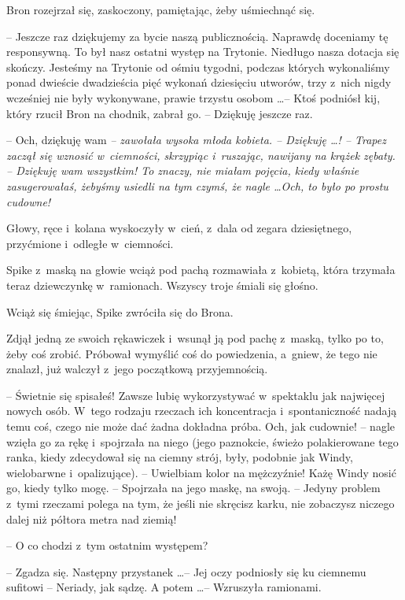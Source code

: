 \documentclass[oneside,polish,11pt,rmheadings]{mwbk}
\begin{document}
Bron rozejrzał się, zaskoczony, pamiętając, żeby uśmiechnąć się. 

-- Jeszcze raz dziękujemy za bycie naszą publicznością. Naprawdę doceniamy tę responsywną. To był nasz ostatni występ na Trytonie. Niedługo nasza dotacja się skończy. Jesteśmy na Trytonie od ośmiu tygodni, podczas których wykonaliśmy ponad dwieście dwadzieścia pięć wykonań dziesięciu utworów, trzy z~nich nigdy wcześniej nie były wykonywane, prawie trzystu osobom \ldots  -- Ktoś podniósł kij, który rzucił Bron na chodnik, zabrał go. -- Dziękuję jeszcze raz. 

-- Och, dziękuję wam \textit{-- zawołała wysoka młoda kobieta. -- Dziękuję  \ldots  ! -- Trapez zaczął się wznosić w~ciemności, skrzypiąc i~ruszając, nawijany na krążek zębaty.  -- Dziękuję wam wszystkim! To znaczy, nie miałam pojęcia, kiedy właśnie zasugerowałaś, żebyśmy usiedli na tym czymś, że nagle \ldots   Och, to było po prostu cudowne!} 

Głowy, ręce i~kolana wyskoczyły w~cień, z~dala od zegara dziesiętnego, przyćmione i~odległe w~ciemności. 

Spike z~maską na głowie wciąż pod pachą rozmawiała z~kobietą, która trzymała teraz dziewczynkę w~ramionach. Wszyscy troje śmiali się głośno. 

Wciąż się śmiejąc, Spike zwróciła się do Brona. 

Zdjął jedną ze swoich rękawiczek i~wsunął ją pod pachę z~maską, tylko po to, żeby coś zrobić. Próbował wymyślić coś do powiedzenia, a~gniew, że tego nie znalazł, już walczył z~jego początkową przyjemnością. 

-- Świetnie się spisałeś! Zawsze lubię wykorzystywać w~spektaklu jak najwięcej nowych osób. W~tego rodzaju rzeczach ich koncentracja i~spontaniczność nadają temu coś, czego nie może dać żadna dokładna próba. Och, jak cudownie! -- nagle wzięła go za rękę i~spojrzała na niego (jego paznokcie, świeżo polakierowane tego ranka, kiedy zdecydował się na ciemny strój, były, podobnie jak Windy, wielobarwne i~opalizujące). -- Uwielbiam kolor na mężczyźnie! Każę Windy nosić go, kiedy tylko mogę. -- Spojrzała na jego maskę, na swoją. -- Jedyny problem z~tymi rzeczami polega na tym, że jeśli nie skręcisz karku, nie zobaczysz niczego dalej niż półtora metra nad ziemią! 

-- O co chodzi z~tym ostatnim występem? 

 -- Zgadza się. Następny przystanek \ldots  -- Jej oczy podniosły się ku ciemnemu sufitowi -- Neriady, jak sądzę. A potem \ldots  -- Wzruszyła ramionami. 
\end{document}
